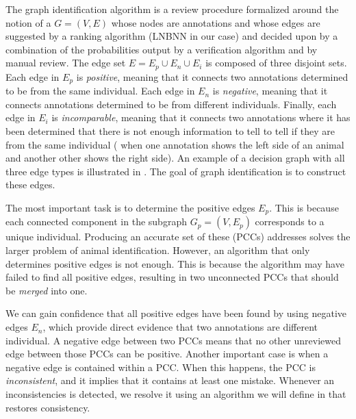 \decisiongraph{}

The graph identification algorithm is a review procedure formalized around the
  notion of a  $G = (V, E)$ whose nodes are
  annotations and whose edges are suggested by a ranking algorithm (LNBNN in our
  case) and decided upon by a combination of the probabilities output by a
  verification algorithm and by manual review.
The edge set $E = E_p \cup E_n \cup E_i$ is composed of three disjoint sets.
Each edge in $E_p$ is \emph{positive}, meaning that it connects two
  annotations determined to be from the same individual.
Each edge in $E_n$ is \emph{negative}, meaning that it connects annotations
  determined to be from different individuals.
Finally, each edge in $E_i$ is \emph{incomparable}, meaning that it connects
  two annotations where it has been determined that there is not enough
  information to tell to tell if they are from the same individual (\eg{} when
  one annotation shows the left side of an animal and another other shows the
  right side).
An example of a decision graph with all three edge types is illustrated in
  .
The goal of graph identification is to construct these edges.

The most important task is to determine the positive edges $E_p$.
This is because each connected component in the subgraph $G_p = (V, E_p)$
  corresponds to a unique individual.
Producing an accurate set of these 
  (PCCs) addresses solves the larger problem of animal identification.
However, an algorithm that only determines positive edges is not enough.
This is because the algorithm may have failed to find all positive edges,
  resulting in two unconnected PCCs that should be \emph{merged} into one.

We can gain confidence that all positive edges have been found by using
  negative edges $E_n$, which provide direct evidence that two annotations are
  different individual.
A negative edge between two PCCs means that no other unreviewed edge between
  those PCCs can be positive.
Another important case is when a negative edge is contained within a PCC.
When this happens, the PCC is \emph{inconsistent}, and it implies that it
  contains at least one mistake.
Whenever an inconsistencies is detected, we resolve it using an algorithm we
  will define in  that restores consistency.

